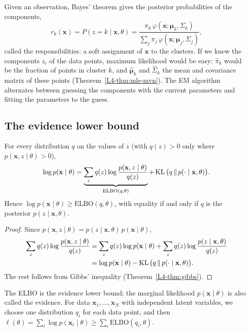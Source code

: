 Given an observation, Bayes' theorem gives the posterior probabilities of the components,
\[r_k(\mathbf{x}) = P(z = k \mid \mathbf{x}, \theta) = \frac{\pi_k\,\varphi(\mathbf{x}; \boldsymbol{\mu}_k, \Sigma_k)}{\sum_j \pi_j\,\varphi(\mathbf{x}; \boldsymbol{\mu}_j, \Sigma_j)},\]
called the responsibilities: a soft assignment of $\mathbf{x}$ to the clusters. If we knew the components $z_i$ of the data points, maximum likelihood would be easy: $\hat\pi_k$ would be the fraction of points in cluster $k$, and $\hat{\boldsymbol{\mu}}_k$ and $\hat\Sigma_k$ the mean and covariance matrix of these points (Theorem~\ref{L4-thm:mle-mvn}). The EM algorithm alternates between guessing the components with the current parameters and fitting the parameters to the guess.

\subsection{The evidence lower bound}

\begin{theorem}\label{L4-thm:elbo}
    For every distribution $q$ on the values of $z$ (with $q(z) > 0$ only where $p(\mathbf{x}, z \mid \theta) > 0$),
    \[\log p(\mathbf{x} \mid \theta) = \underbrace{\sum_z q(z)\log\frac{p(\mathbf{x}, z \mid \theta)}{q(z)}}_{\mathrm{ELBO}(q, \theta)} + \operatorname{KL}\big(q \,\|\, p(\cdot \mid \mathbf{x}, \theta)\big).\]
    Hence $\log p(\mathbf{x} \mid \theta) \geq \mathrm{ELBO}(q, \theta)$, with equality if and only if $q$ is the posterior $p(z \mid \mathbf{x}, \theta)$.
\end{theorem}

\begin{proof}
    Since $p(\mathbf{x}, z \mid \theta) = p(z \mid \mathbf{x}, \theta)\,p(\mathbf{x} \mid \theta)$,
    \begin{align*}
        \sum_z q(z)\log\frac{p(\mathbf{x}, z \mid \theta)}{q(z)} &= \sum_z q(z)\log p(\mathbf{x} \mid \theta) + \sum_z q(z)\log\frac{p(z \mid \mathbf{x}, \theta)}{q(z)} \\
        &= \log p(\mathbf{x} \mid \theta) - \operatorname{KL}\big(q \,\|\, p(\cdot \mid \mathbf{x}, \theta)\big).
    \end{align*}
    The rest follows from Gibbs' inequality (Theorem~\ref{L4-thm:gibbs}).
\end{proof}

The ELBO is the evidence lower bound; the marginal likelihood $p(\mathbf{x} \mid \theta)$ is also called the evidence. For data $\mathbf{x}_1, \ldots, \mathbf{x}_N$ with independent latent variables, we choose one distribution $q_i$ for each data point, and then $\ell(\theta) = \sum_i \log p(\mathbf{x}_i \mid \theta) \geq \sum_i \mathrm{ELBO}(q_i, \theta)$.

